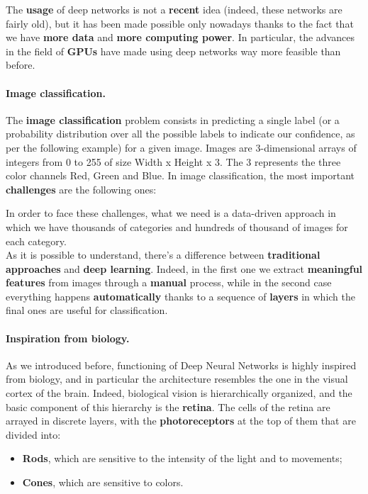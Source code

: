 The \textbf{usage} of deep networks is not a \textbf{recent} idea (indeed, these networks are fairly old), but it has been made possible only nowadays thanks to the fact that we have \textbf{more data} and \textbf{more computing power}. In particular, the advances in the field of \textbf{GPUs} have made using deep networks way more feasible than before.

\paragraph{Image classification.} The \textbf{image classification} problem consists in predicting a single label (or a probability distribution over all the possible labels to indicate our confidence, as per the following example) for a given image. Images are 3-dimensional arrays of integers from 0 to 255 of size Width x Height x 3. The 3 represents the three color channels Red, Green and Blue.
In image classification, the most important \textbf{challenges} are the following ones:

In order to face these challenges, what we need is a data-driven approach in which we have thousands of categories and hundreds of thousand of images for each category.\\
As it is possible to understand, there's a difference between \textbf{traditional approaches} and \textbf{deep learning}. Indeed, in the first one we extract \textbf{meaningful features} from images through a \textbf{manual} process, while in the second case everything happens \textbf{automatically} thanks to a sequence of \textbf{layers} in which the final ones are useful for classification.

\paragraph{Inspiration from biology.} As we introduced before, functioning of Deep Neural Networks is highly inspired from biology, and in particular the architecture resembles the one in the visual cortex of the brain. Indeed, biological vision is hierarchically organized, and the basic component of this hierarchy is the \textbf{retina}. The cells of the retina are arrayed in discrete layers, with the \textbf{photoreceptors} at the top of them that are divided into:

\begin{itemize}
    \item \textbf{Rods}, which are sensitive to the intensity of the light and to movements;
    \item \textbf{Cones}, which are sensitive to colors.
\end{itemize}

